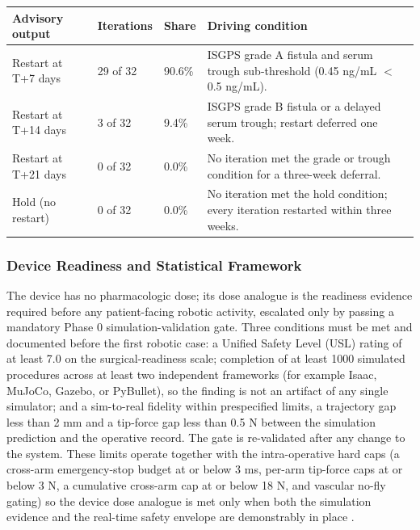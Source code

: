\noindent\begin{tabularx}{\textwidth}{L{3.2cm} C{2.0cm} C{2.4cm} Y}
\toprule
\textbf{Advisory output} & \textbf{Iterations} & \textbf{Share} & \textbf{Driving condition} \\
\midrule
Restart at T+7 days & 29 of 32 & 90.6\% & ISGPS grade A fistula and serum trough sub-threshold (0.45 ng/mL $<$ 0.5 ng/mL). \\
\addlinespace
Restart at T+14 days & 3 of 32 & 9.4\% & ISGPS grade B fistula or a delayed serum trough; restart deferred one week. \\
\addlinespace
Restart at T+21 days & 0 of 32 & 0.0\% & No iteration met the grade or trough condition for a three-week deferral. \\
\addlinespace
Hold (no restart) & 0 of 32 & 0.0\% & No iteration met the hold condition; every iteration restarted within three weeks. \\
\bottomrule
\end{tabularx}

\subsubsection{Device Readiness and Statistical Framework}

The device has no pharmacologic dose; its dose analogue is the readiness evidence
required before any patient-facing robotic activity, escalated only by passing a
mandatory Phase 0 simulation-validation gate. Three conditions must be met and
documented before the first robotic case: a Unified Safety Level (USL) rating of at
least 7.0 on the surgical-readiness scale; completion of at least 1000 simulated
procedures across at least two independent frameworks (for example Isaac, MuJoCo,
Gazebo, or PyBullet), so the finding is not an artifact of any single simulator; and
a sim-to-real fidelity within prespecified limits, a trajectory gap less than 2 mm
and a tip-force gap less than 0.5 N between the simulation prediction and the
operative record. The gate is re-validated after any change to the system. These
limits operate together with the intra-operative hard caps (a cross-arm
emergency-stop budget at or below 3 ms, per-arm tip-force caps at or below 3 N, a
cumulative cross-arm cap at or below 18 N, and vascular no-fly gating) so the device
dose analogue is met only when both the simulation evidence and the real-time safety
envelope are demonstrably in place \cite{onpremwhippl,daraxwhipple}.

